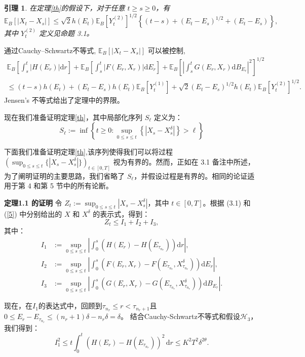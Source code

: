 \documentclass[12pt,final]{article}
\makeatletter
\numberwithin{equation}{section}
\numberwithin{figure}{section}
\numberwithin{table}{section}
\theoremstyle{plain}
\newtheorem{lemma}{引理}[section]
\renewcommand{\proofname}{证明}
\renewenvironment{proof}[1][\proofname]{\par
	\pushQED{\qed}%
	\normalfont \topsep6\p@\@plus6\p@\relax
	\trivlist\item[\hskip\labelsep
	\bfseries #1\@addpunct{\,:\,}]\ignorespaces
}{%
	\popQED\endtrivlist\@endpefalse
}
\makeatother
\begin{document}
	\begin{lemma}
		在定理\ref{th}的假设下，对于任意 $t \geq s \geq 0$，有
		\[
		\mathbb{E}_B[|X_t - X_s|] \leq \sqrt{2} h(E_t) \mathbb{E}_B[Y_t^{(2)}]^{1/2} \left\{(t - s) + (E_t - E_s)^{1/2} + (E_t - E_s)\right\},
		\]
		其中 $Y_t^{(2)}$ 定义见命题 3.1。
	\end{lemma}
	\begin{proof}
		通过Cauchy–Schwartz不等式, $\mathbb{E}_B[|X_t-X_s|]$ 可以被控制,
		\begin{gather*}
			\mathbb{E}_{B}\left[\int_{s}^{t}|H(E_{r})|\mathrm{d}r\right]+\mathbb{E}_{B}\left[\int_{s}^{t}|F(E_{r},X_{r})|\mathrm{d}E_{r}\right]+\mathbb{E}_{B}\left[\left|\int_{s}^{t}G(E_{r},X_{r})\mathrm{d}B_{E_{r}}\right|^{2}\right]^{1/2} \\
			\leq(t-s)h(E_t)+(E_t-E_s)h(E_t)\mathbb{E}_B[Y_t^{(1)}]+\sqrt{2}(E_t-E_s)^{1/2}h(E_t)\mathbb{E}_B[Y_t^{(2)}]^{1/2}. 
		\end{gather*}
		Jensen's 不等式给出了定理中的界限。
	\end{proof}
	
	现在我们准备证明定理\ref{th}，其中局部化序列 $S_\ell$ 定义为：
	\[
	S_\ell := \inf\left\{ t \geq 0 : \sup_{0 \leq s \leq t} \left\{|X_s - X_s^\delta|\right\} > \ell \right\}
	\]
	
	下面我们准备证明定理\ref{th},该序列使得我们可以将过程 $(\sup_{0 \leq s \leq t} \{|X_s - X_s^\delta|\})_{t \in [0, T]}$ 视为有界的。然而，正如在 3.1 备注中所述，为了阐明证明的主要思路，我们省略了 $S_\ell$，并假设过程是有界的。相同的论证适用于第 4 和第 5 节中的所有论断。
	
	
	\textbf{定理1.1 的证明} \quad 令 $Z_t := \sup_{0 \leq s \leq t} |X_s - X_s^\delta|$，其中 $t \in [0, T]$。根据 (3.1) 和 (\ref{5}) 中分别给出的 $X$ 和 $X^\delta$ 的表示式，得到：
	\[
	Z_t \leq I_1 + I_2 + I_3,
	\]
	其中：
	\[
	\begin{aligned}
		I_1 & := \sup_{0 \leq s \leq t} \left| \int_0^s (H(E_r) - H(E_{\tau_{n_r}})) \mathrm{d}r \right|, \\
		I_2 & := \sup_{0 \leq s \leq t} \left| \int_0^s (F(E_r, X_r) - F(E_{\tau_{n_r}}, X_{\tau_{n_r}}^\delta)) \mathrm{d}E_r \right|, \\
		I_3 & := \sup_{0 \leq s \leq t} \left| \int_0^s (G(E_r, X_r) - G(E_{\tau_{n_r}}, X_{\tau_{n_r}}^\delta)) \mathrm{d}B_{E_r} \right|.
	\end{aligned}
	\]
	
	现在，在$I_1$的表达式中，回顾到$\tau_{n_r} \leq r < \tau_{n_r+1}$且$0 \leq E_r - E_{\tau_{n_r}} \leq (n_r+1)\delta - n_r\delta = \delta$。
	结合Cauchy-Schwartz不等式和假设$\mathcal{H}_3$，我们得到：
	\begin{equation}\label{6}
		I_1^2 \leq t \int_0^t (H(E_r) - H(E_{\tau_{n_r}}))^2 \, \mathrm{d}r \leq K^2 T^2 \delta^{2\theta}.
	\end{equation}
	
\end{document}
